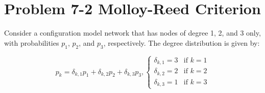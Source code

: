 \section*{Problem 7-2 Molloy-Reed Criterion}

Consider a configuration model network that has nodes of degree 1, 2, and 3 only, with probabilities $p_1$, $p_2$, and $p_3$, respectively. The degree distribution is given by:

\begin{equation} \label{eq}
	p_k = \delta_{k,1} p_1 + \delta_{k,2} p_2 + \delta_{k,3} p_3, 
	\begin{cases}
		\delta_{k,1} = 3 & \text{if $k = 1$} \\
		\delta_{k,2} = 2 & \text{if $k = 2$} \\
		\delta_{k,3} = 1 & \text{if $k = 3$}
	\end{cases}
\end{equation}

